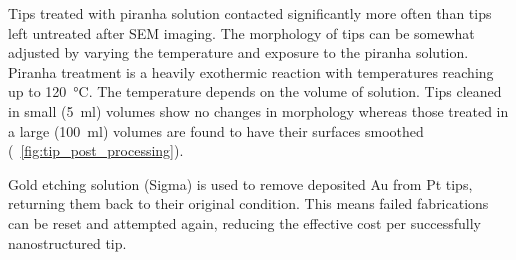 \documentclass{article}
\begin{document}
Tips treated with piranha solution contacted {\color{red}significantly more often than} tips left untreated after SEM imaging. The morphology of tips can be somewhat adjusted by varying the temperature and exposure to the piranha solution. Piranha treatment is a heavily exothermic reaction with temperatures reaching up to \SI{120}{\celsius}. The temperature depends on the volume of solution. Tips cleaned in small (\SI{5}{ml}) volumes show no changes in morphology whereas those treated in a large (\SI{100}{ml}) volumes are found to have their surfaces smoothed (\figurename~\ref{fig:tip_post_processing}).

Gold etching solution (Sigma) is used to remove deposited Au from Pt tips, returning them back to their original condition. This means failed fabrications can be reset and attempted again, reducing the effective cost per successfully nanostructured tip.
\end{document}

